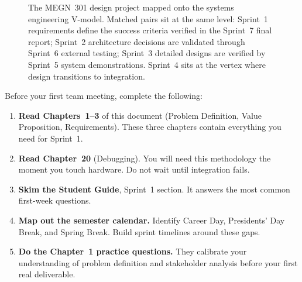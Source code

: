 \documentclass[11pt,letterpaper,twoside,openany]{book}
\begin{document}
\begin{figure}[htbp]
{%
}%
\caption{The MEGN~301 design project mapped onto the systems engineering V-model. Matched pairs sit at the same level: Sprint~1 requirements define the success criteria verified in the Sprint~7 final report; Sprint~2 architecture decisions are validated through Sprint~6 external testing; Sprint~3 detailed designs are verified by Sprint~5 system demonstrations. Sprint~4 sits at the vertex where design transitions to integration.}\label{fig:vmodel_mrd}
\end{figure}


\begin{checklistbox}
Before your first team meeting, complete the following:
\begin{enumerate}[nosep,leftmargin=1.5em]
\item \textbf{Read Chapters~1--3} of this document (Problem Definition, Value Proposition, Requirements). These three chapters contain everything you need for Sprint~1.
\item \textbf{Read Chapter~20} (Debugging). You will need this methodology the moment you touch hardware. Do not wait until integration fails.
\item \textbf{Skim the Student Guide}, Sprint~1 section. It answers the most common first-week questions.
\item \textbf{Map out the semester calendar.} Identify Career Day, Presidents' Day Break, and Spring Break. Build sprint timelines around these gaps.
\item \textbf{Do the Chapter~1 practice questions.} They calibrate your understanding of problem definition and stakeholder analysis before your first real deliverable.
\end{enumerate}
\end{checklistbox}
\end{document}

